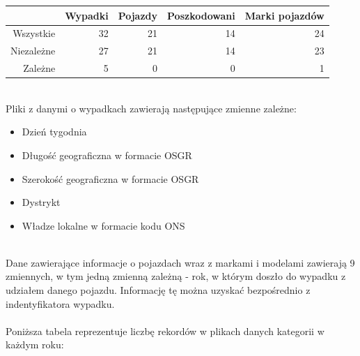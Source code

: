 \documentclass{article}
\begin{document}
\begin{tabular}{|r|r|r|r|r|}
  \hline 
    & Wypadki & Pojazdy & Poszkodowani & Marki pojazdów\\
  \hline 
  Wszystkie & 32 & 21 & 14 & 24\\
  \hline
  Niezależne & 27 & 21 & 14 & 23\\
  \hline
  Zależne & 5 & 0 & 0 & 1\\
  \hline
\end{tabular} \\[0.5cm]
Pliki z danymi o wypadkach zawierają następujące zmienne zależne: %
\begin{itemize}
    \item  Dzień tygodnia
    \item  Długość geograficzna w formacie OSGR 
    \item  Szerokość geograficzna w formacie OSGR 
    \item  Dystrykt
    \item  Władze lokalne w formacie kodu ONS
\end{itemize}\\
Dane zawierające informacje o pojazdach wraz z markami i modelami zawierają 9 zmiennych, w tym jedną zmienną zależną - rok, w którym doszło do wypadku z udziałem danego pojazdu. Informację tę można uzyskać bezpośrednio z indentyfikatora wypadku.\\\\
Poniższa tabela reprezentuje liczbę rekordów w plikach danych kategorii w każdym roku:\\
\end{document}
